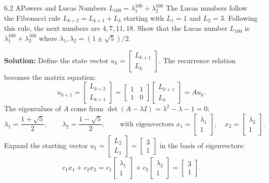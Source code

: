 \documentclass[11pt,a4paper,openany,oneside]{book}
\def\vect#1{#1}%
\def\mathbf#1{#1}%
\newcommand{\vect}[1]{\mathbf{#1}}
\numberwithin{equation}{chapter}
\begin{document}
\begin{example}{6.2 A}{Powers and Lucas Numbers $L_{100} = \lambda_1^{100} + \lambda_2^{100}$}
The Lucas numbers follow the Fibonacci rule $L_{k+2} = L_{k+1} + L_k$ starting with $L_1 = 1$ and $L_2 = 3$. Following this rule, the next numbers are $4, 7, 11, 18$. Show that the Lucas number $L_{100}$ is $\lambda_1^{100} + \lambda_2^{100}$ where $\lambda_1, \lambda_2 = (1\pm\sqrt{5})/2$.
\end{example}
\textbf{Solution:} Define the state vector $\vect{u}_k = \begin{bmatrix} L_{k+1} \\ L_k \end{bmatrix}$. The recurrence relation becomes the matrix equation:
\[
\vect{u}_{k+1} = \begin{bmatrix} L_{k+2} \\ L_{k+1} \end{bmatrix} = \begin{bmatrix} 1 & 1 \\ 1 & 0 \end{bmatrix}\begin{bmatrix} L_{k+1} \\ L_k \end{bmatrix} = A\vect{u}_k.
\]
The eigenvalues of $A$ come from $\det(A-\lambda I) = \lambda^2 - \lambda - 1 = 0$:
\[
\lambda_1 = \frac{1+\sqrt{5}}{2}, \qquad \lambda_2 = \frac{1-\sqrt{5}}{2}, \qquad \text{with eigenvectors } \vect{x}_1 = \begin{bmatrix} \lambda_1 \\ 1 \end{bmatrix}, \quad \vect{x}_2 = \begin{bmatrix} \lambda_2 \\ 1 \end{bmatrix}.
\]
Expand the starting vector $\vect{u}_1 = \begin{bmatrix} L_2 \\ L_1 \end{bmatrix} = \begin{bmatrix} 3 \\ 1 \end{bmatrix}$ in the basis of eigenvectors:
\[
c_1\vect{x}_1 + c_2\vect{x}_2 = c_1\begin{bmatrix} \lambda_1 \\ 1 \end{bmatrix} + c_2\begin{bmatrix} \lambda_2 \\ 1 \end{bmatrix} = \begin{bmatrix} 3 \\ 1 \end{bmatrix}.
\]
\end{document}
